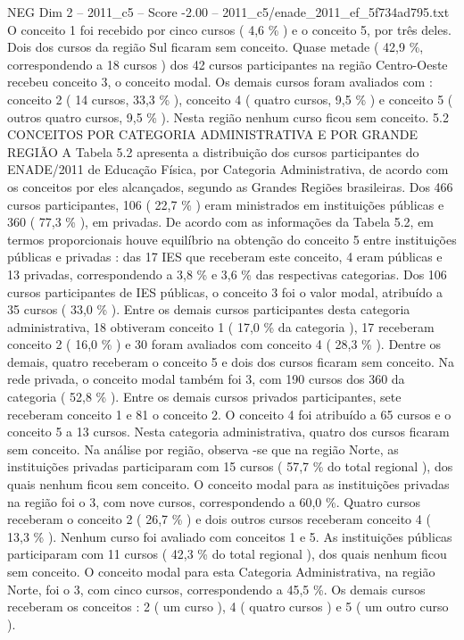 \begin{textsample}{NEG Dim 2 – 2011\_c5 – Score -2.00 – 2011\_c5/enade\_2011\_ef\_5f734ad795.txt}
O conceito 1 foi recebido por cinco cursos ( 4,6 \% ) e o conceito 5, por três deles.
Dois dos cursos da região Sul ficaram sem conceito.
Quase metade ( 42,9 \%, correspondendo a 18 cursos ) dos 42 cursos participantes na região Centro-Oeste recebeu conceito 3, o conceito modal.
Os demais cursos foram avaliados com : conceito 2 ( 14 cursos, 33,3 \% ), conceito 4 ( quatro cursos, 9,5 \% ) e conceito 5 ( outros quatro cursos, 9,5 \% ).
Nesta região nenhum curso ficou sem conceito. 5.2 CONCEITOS POR CATEGORIA ADMINISTRATIVA E POR GRANDE REGIÃO A Tabela 5.2 apresenta a distribuição dos cursos participantes do ENADE/2011 de Educação Física, por Categoria Administrativa, de acordo com os conceitos por eles alcançados, segundo as Grandes Regiões brasileiras.
Dos 466 cursos participantes, 106 ( 22,7 \% ) eram ministrados em instituições públicas e 360 ( 77,3 \% ), em privadas.
De acordo com as informações da Tabela 5.2, em termos proporcionais houve equilíbrio na obtenção do conceito 5 entre instituições públicas e privadas : das 17 IES que receberam este conceito, 4 eram públicas e 13 privadas, correspondendo a 3,8 \% e 3,6 \% das respectivas categorias.
Dos 106 cursos participantes de IES públicas, o conceito 3 foi o valor modal, atribuído a 35 cursos ( 33,0 \% ).
Entre os demais cursos participantes desta categoria administrativa, 18 obtiveram conceito 1 ( 17,0 \% da categoria ), 17 receberam conceito 2 ( 16,0 \% ) e 30 foram avaliados com conceito 4 ( 28,3 \% ).
Dentre os demais, quatro receberam o conceito 5 e dois dos cursos ficaram sem conceito.
Na rede privada, o conceito modal também foi 3, com 190 cursos dos 360 da categoria ( 52,8 \% ).
Entre os demais cursos privados participantes, sete receberam conceito 1 e 81 o conceito 2.
O conceito 4 foi atribuído a 65 cursos e o conceito 5 a 13 cursos.
Nesta categoria administrativa, quatro dos cursos ficaram sem conceito.
Na análise por região, observa -se que na região Norte, as instituições privadas participaram com 15 cursos ( 57,7 \% do total regional ), dos quais nenhum ficou sem conceito.
O conceito modal para as instituições privadas na região foi o 3, com nove cursos, correspondendo a 60,0 \%.
Quatro cursos receberam o conceito 2 ( 26,7 \% ) e dois outros cursos receberam conceito 4 ( 13,3 \% ).
Nenhum curso foi avaliado com conceitos 1 e 5.
As instituições públicas participaram com 11 cursos ( 42,3 \% do total regional ), dos quais nenhum ficou sem conceito.
O conceito modal para esta Categoria Administrativa, na região Norte, foi o 3, com cinco cursos, correspondendo a 45,5 \%.
Os demais cursos receberam os conceitos : 2 ( um curso ), 4 ( quatro cursos ) e 5 ( um outro curso ).

\end{textsample}
